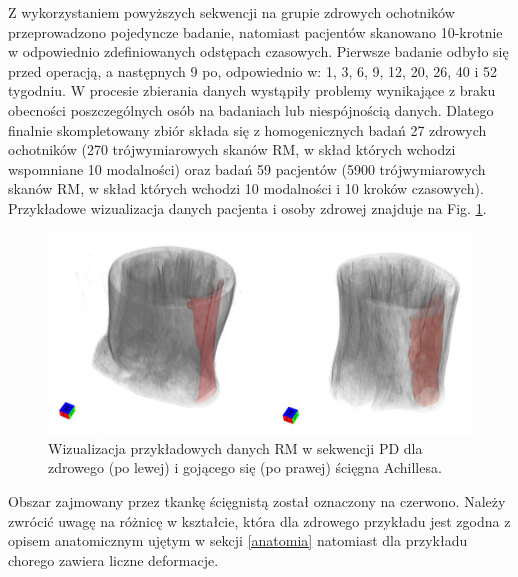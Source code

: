Z wykorzystaniem powyższych sekwencji na grupie zdrowych ochotników przeprowadzono pojedyncze badanie, natomiast pacjentów skanowano 10-krotnie w odpowiednio zdefiniowanych odstępach czasowych. Pierwsze badanie odbyło się przed operacją, a następnych 9 po, odpowiednio w: 1, 3, 6, 9, 12, 20, 26, 40 i 52 tygodniu. W procesie zbierania danych wystąpiły problemy wynikające z braku obecności poszczególnych osób na badaniach lub niespójnością danych. Dlatego finalnie skompletowany zbiór składa się z homogenicznych badań 27 zdrowych ochotników (270 trójwymiarowych skanów RM, w skład których wchodzi wspomniane 10 modalności) oraz badań 59 pacjentów (5900 trójwymiarowych skanów RM, w skład których wchodzi 10 modalności i 10 kroków czasowych). Przykładowe wizualizacja danych pacjenta i osoby zdrowej znajduje na Fig. \ref{fig:MRI_sample}. 
\begin{figure}[h!]
	\includegraphics[width=\textwidth]{figures/Data_MRI_sample.png}
	\caption{Wizualizacja przykładowych danych RM w sekwencji PD dla zdrowego (po lewej) i gojącego się (po prawej) ścięgna Achillesa.}
	 \label{fig:MRI_sample}
\end{figure}
Obszar zajmowany przez tkankę ścięgnistą został oznaczony na czerwono. Należy zwrócić uwagę na różnicę w kształcie, która dla zdrowego przykładu jest zgodna z opisem anatomicznym ujętym w sekcji \ref{anatomia} natomiast dla przykładu chorego zawiera liczne deformacje.

